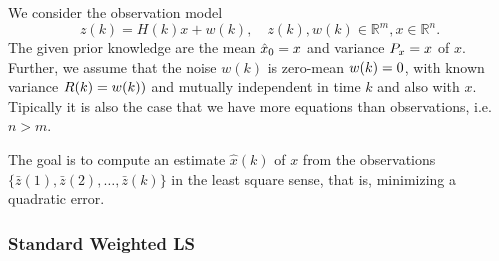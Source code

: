 \documentclass[margin=small]{hsrzf}
\makeatletter
\let\ost@expectation\relax \let\ost@variance\relax
\let\E\relax \let\Var\relax
\DeclareMathOperator*{\ost@expectation}{E}
\newcommand*{\E}[2][]{\ost@expectation_{#1}\left\{#2\right\}}
\DeclareMathOperator*{\ost@variance}{Var}
\newcommand*{\Var}[2][]{\ost@variance_{#1}\left\{#2\right\}}
\theoremstyle{plain}
\theoremstyle{definition}
\theoremstyle{remark}
\makeatother
\begin{document}
We consider the observation model
\[
  z(k) = H(k) x + w(k),
  \quad
  z(k), w(k) \in\mathbb{R}^m, x \in\mathbb{R}^n.
\]
The given prior knowledge are the mean $\hat{x}_0 = \E{x}$ and variance $P_x =
\Var{x}$ of $x$. Further, we assume that the noise $w(k)$ is zero-mean
$\E{w(k)} = 0$, with known variance $R(k) = \Var{w(k))}$ and mutually
independent in time $k$ and also with $x$. Tipically it is also the case that
we have more equations than observations, i.e. $n > m$.

The goal is to compute an estimate $\hat{x}(k)$ of $x$ from the observations
$\{\bar{z}(1), \bar{z}(2), \ldots, \bar{z}(k)\}$ in the least square sense,
that is, minimizing a quadratic error.

\subsubsection{Standard Weighted LS}
\end{document}
